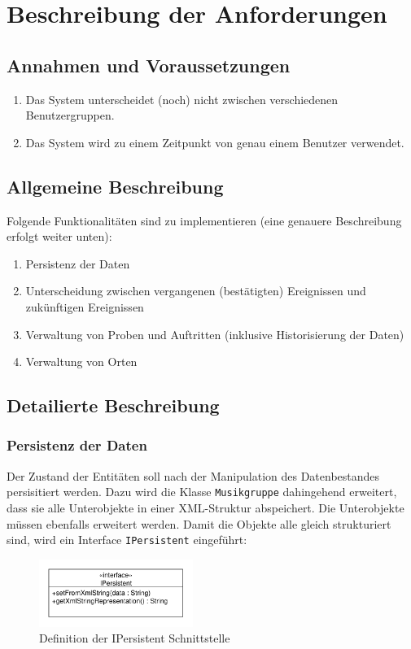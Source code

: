 \documentclass[12pt,oneside,a4paper]{scrartcl}
\begin{document}
\section{Beschreibung der Anforderungen}
\subsection{Annahmen und Voraussetzungen}
\begin{enumerate}
	\item Das System unterscheidet (noch) nicht zwischen verschiedenen Benutzergruppen.
	\item Das System wird zu einem Zeitpunkt von genau einem Benutzer verwendet.
\end{enumerate}

\subsection{Allgemeine Beschreibung}
Folgende Funktionalitäten sind zu implementieren (eine genauere Beschreibung erfolgt weiter unten):
\begin{enumerate}
	\item Persistenz der Daten
	\item Unterscheidung zwischen vergangenen (bestätigten) Ereignissen und zukünftigen Ereignissen
	\item Verwaltung von Proben und Auftritten (inklusive Historisierung der Daten)
	\item Verwaltung von Orten
\end{enumerate}

\subsection{Detailierte Beschreibung}
\subsubsection*{Persistenz der Daten}
Der Zustand der Entitäten soll nach der Manipulation des Datenbestandes persisitiert werden.
Dazu wird die Klasse \texttt{Musikgruppe} dahingehend erweitert, dass sie alle Unterobjekte
in einer XML-Struktur abspeichert. Die Unterobjekte müssen ebenfalls erweitert werden.
Damit die Objekte alle gleich strukturiert sind, wird ein Interface \texttt{IPersistent} eingeführt:

\begin{figure}[htbp]
	\centering
	\includegraphics[width=5.0cm]{ipersistent.pdf}
	\caption{Definition der IPersistent Schnittstelle}
	\label{image:ipersistent}
\end{figure}
\end{document}

